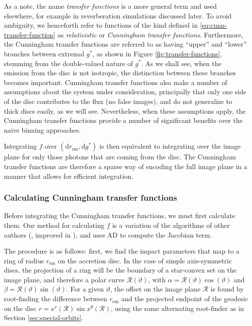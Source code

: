 \documentclass[fleqn,usenatbib]{mnras}
\renewcommand{\d}{\text{d}}
\begin{document}
As a note, the name \emph{transfer functions} is a more general term and used
elsewhere, for example in reverberation simulations discussed later. To avoid
ambiguity, we henceforth refer to functions of the kind defined in
\eqref{eq:cunn-transfer-function} as \emph{relativistic} or \emph{Cunningham
transfer functions}. Furthermore, the Cunningham transfer functions are referred
to as having ``upper'' and ``lower'' branches between extremal $g^\ast$, as
shown in Figure \ref{fig:transfer-functions}, stemming from the double-valued
nature of $g^\ast$. As we shall see, when the emission from the disc is not
isotropic, the distinction between these branches becomes important. Cunningham
transfer functions also make a number of assumptions about the system under
consideration, principally that only one side of the disc contributes to the
flux (no false images), and do not generalize to thick discs easily, as we will
see. Nevertheless, when these assumptions apply, the Cunningham transfer
functions provide a number of significant benefits over the naive binning
approaches.

Integrating $f$ over $(\d r_\text{em}, \d g^\ast)$ is then equivalent to
integrating over the image plane for only those photons that are coming from the
disc. The Cunningham transfer functions are therefore a sparse way of encoding
the full image plane in a manner that allows for efficient integration.

\subsubsection{Calculating Cunningham transfer functions}

Before integrating the Cunningham transfer functions, we must first calculate
them. Our method for calculating $f$ is a variation of the algorithms of other
authors (\citealp{speith_photon_1995,bambi_testing_2017}, improved in
\citealp{abdikamalov_public_2019}), and uses AD to compute the Jacobian term.

The procedure is as follows: first, we find the impact parameters that map to a
ring of radius $r_\text{em}$ on the accretion disc. In the case of simple
axis-symmetric discs, the projection of a ring will be the boundary of a
star-convex set on the image plane, and therefore a polar curve
$\mathcal{R}(\vartheta)$, with $\alpha = \mathcal{R}(\vartheta) \cos(\vartheta)$
and $\beta = \mathcal{R}(\vartheta) \sin(\vartheta)$. For a given $\vartheta$,
the offset on the image plane $\mathcal{R}$ is found by root-finding the
difference between $r_\text{em}$ and the projected endpoint of the geodesic on
the disc $r = x^r (\mathcal{R}) \sin x^\theta(\mathcal{R})$, using the same
alternating root-finder as in Section \ref{sec:special-orbits}.
\end{document}
